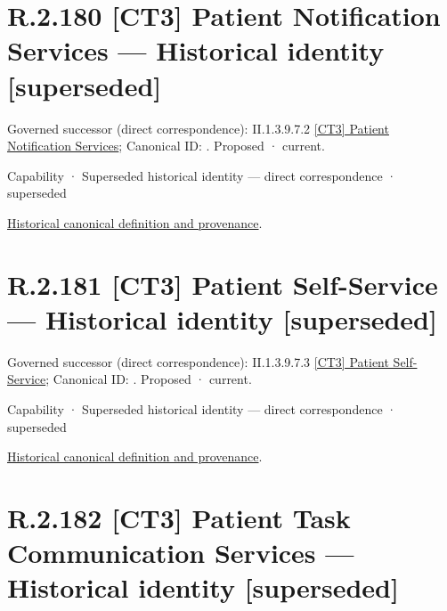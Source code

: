 \section*{R.2.180 [CT3] Patient Notification Services — Historical identity [superseded]}
\label{navigation:R.2.180}

{\small Governed successor (direct correspondence): II.1.3.9.7.2 \hyperref[element:9d172cd511b742499c4e7c23f6630a35]{[CT3] Patient Notification Services}; Canonical ID: \texttt{}. Proposed · current.}\par
\label{element:35c5be472bf2433fbbde9646d87aefb3}
{\small Capability · Superseded historical identity — direct correspondence · superseded}\par
\href{../../../../continuum/strategy/capability/35c5be472bf2433fbbde9646d87aefb3.md}{Historical canonical definition and provenance}.\par
\section*{R.2.181 [CT3] Patient Self-Service — Historical identity [superseded]}
\label{navigation:R.2.181}

{\small Governed successor (direct correspondence): II.1.3.9.7.3 \hyperref[element:d4956cab8b2b46c396899949c9486a1c]{[CT3] Patient Self-Service}; Canonical ID: \texttt{}. Proposed · current.}\par
\label{element:60f427e6b5764757b909624085a2af89}
{\small Capability · Superseded historical identity — direct correspondence · superseded}\par
\href{../../../../continuum/strategy/capability/60f427e6b5764757b909624085a2af89.md}{Historical canonical definition and provenance}.\par
\section*{R.2.182 [CT3] Patient Task Communication Services — Historical identity [superseded]}
\label{navigation:R.2.182}

